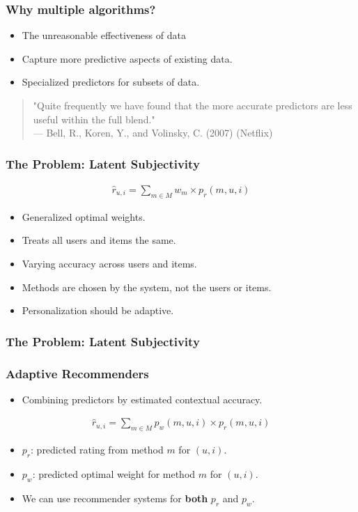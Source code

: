 \documentclass[screen]{beamer}
\begin{document}
\begin{frame}
  \frametitle{Why multiple algorithms?}
  \begin{itemize}
    \item The unreasonable effectiveness of data
    \item Capture more predictive aspects of existing data.
    \item Specialized predictors for subsets of data.
  \end{itemize}
  \vspace{2em}
  \begin{quote}
    "Quite frequently we have found that the more accurate predictors are less useful within the full blend."\\
    --- Bell, R., Koren, Y., and Volinsky, C. (2007) (Netflix)
  \end{quote}  
\end{frame}

\begin{frame}
  \frametitle{The Problem: Latent Subjectivity}
  \begin{eqnarray}
    \hat{r}_{u,i} = \sum_{m \in M} w_{m} \times p_{r}(m,u,i)
  \end{eqnarray}
  \begin{itemize}
    \item Generalized optimal weights.
    \item Treats all users and items the same.
    \item Varying accuracy across users and items.
    \item Methods are chosen by the system, not the users or items.
    \item Personalization should be adaptive.
  \end{itemize}
\end{frame}

\begin{frame}
  \frametitle{The Problem: Latent Subjectivity}
  \huge
  \linespread{2}{
    Systems that insist on being adaptive in a certain way
    are not really adaptive at all.
  }
\end{frame}

\begin{frame}
  \frametitle{Adaptive Recommenders}
  \begin{itemize}
    \item Combining predictors by estimated contextual accuracy.
  \end{itemize}
  \begin{eqnarray}
    \hat{r}_{u,i} = \sum_{m \in M} p_{w}(m,u,i) \times p_{r}(m,u,i)
  \end{eqnarray}
  \begin{itemize}
    \item $p_r$: predicted rating from method $m$ for $(u,i)$.
    \item $p_w$: predicted optimal weight for method $m$ for $(u,i)$.
    \item We can use recommender systems for \textbf{both} $p_r$ and $p_w$.
  \end{itemize}
\end{frame}
\end{document}
